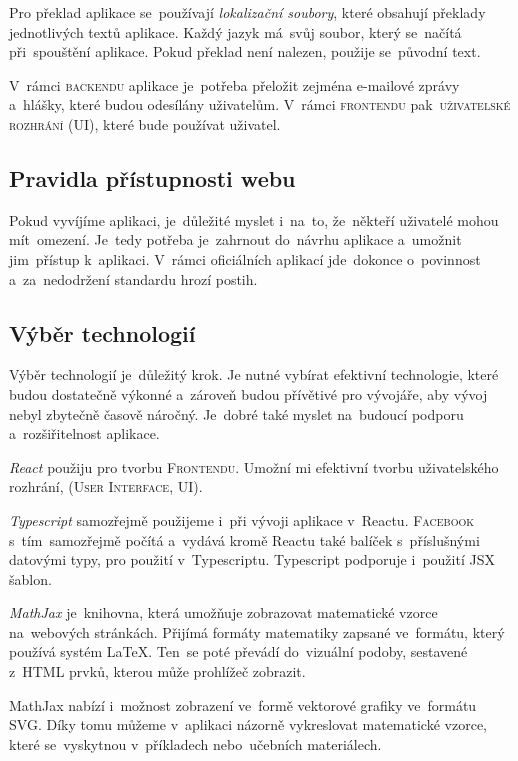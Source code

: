\documentclass[14pt,a4paper]{article}
\begin{document}
        Pro překlad aplikace se~používají \emph{lokalizační soubory}, které obsahují překlady jednotlivých textů aplikace. Každý jazyk má~svůj soubor, který se~načítá při~spouštění aplikace. Pokud překlad není nalezen, použije se~původní text.

        V~rámci \textsc{backendu} aplikace je~potřeba přeložit zejména e-mailové zprávy a~hlášky, které budou odesílány uživatelům. V~rámci \textsc{frontendu} pak~\textsc{uživatelské rozhrání (UI)}, které bude používat uživatel.

        \subsection{Pravidla přístupnosti webu}
        Pokud vyvíjíme aplikaci, je~důležité myslet i~na~to, že~někteří uživatelé mohou mít~omezení. Je~tedy potřeba je~zahrnout do~návrhu aplikace a~umožnit jim~přístup k~aplikaci. V~rámci oficiálních aplikací jde~dokonce o~povinnost a~za~nedodržení standardu hrozí postih.


        \subsection{Výběr technologií}
            Výběr technologií je~důležitý krok. Je nutné vybírat efektivní technologie, které budou dostatečně výkonné a~zároveň budou
            přívětivé pro vývojáře, aby vývoj nebyl zbytečně časově náročný. Je~dobré také myslet na~budoucí podporu a~rozšiřitelnost aplikace.

            \emph{React} použiju pro tvorbu \textsc{Frontendu}. Umožní mi efektivní tvorbu uživatelského rozhrání, (\textsc{User Interface, UI}).

            \emph{Typescript} samozřejmě použijeme i~při vývoji aplikace v~Reactu. \textsc{Facebook} s~tím~samozřejmě počítá a~vydává
            kromě Reactu také balíček s~příslušnými datovými typy, pro použití v~Typescriptu. Typescript podporuje i~použití JSX šablon. \cite[Refeerence/Handbook/JSX]{TypeScript}

            \emph{MathJax} je~knihovna, která umožňuje zobrazovat matematické vzorce na~webových stránkách.
            Přijímá formáty matematiky zapsané ve~formátu, který používá systém \LaTeX. Ten~se poté převádí do~vizuální podoby, sestavené z~HTML prvků, kterou může prohlížeč zobrazit.
            
            MathJax nabízí i~možnost zobrazení ve~formě vektorové grafiky ve~formátu SVG.
            Díky tomu můžeme v~aplikaci názorně vykreslovat matematické vzorce, které se~vyskytnou v~příkladech nebo~učebních materiálech.\cite{abclinuxuMatematickxE9Vzorce}
\end{document}
